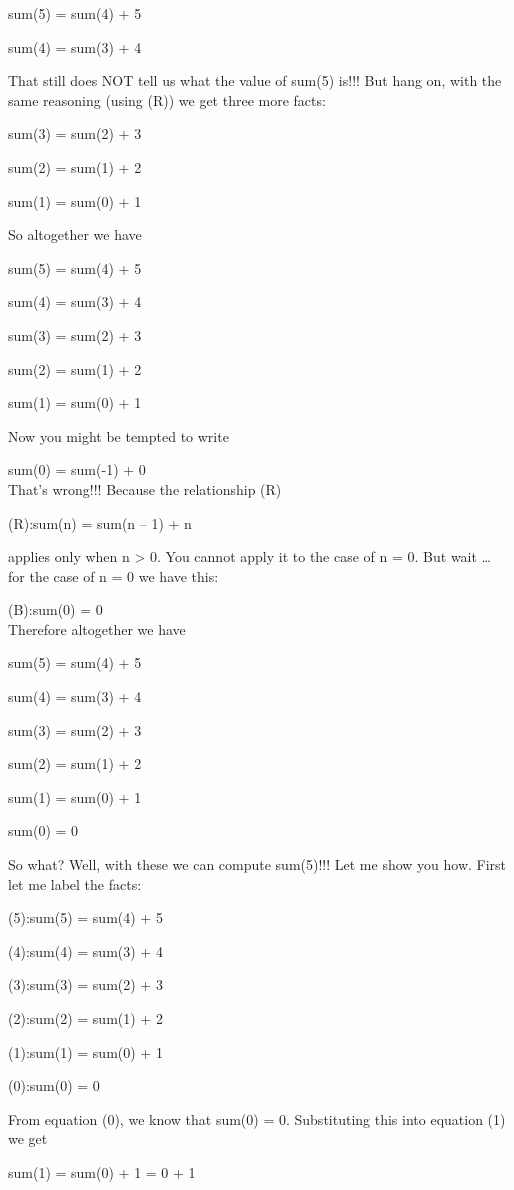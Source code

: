\documentclass[
]{article}
\begin{document}
sum(5) = sum(4) + 5

sum(4) = sum(3) + 4

That still does NOT tell us what the value of sum(5) is!!! But hang on,
with the same reasoning (using (R)) we get three more facts:

sum(3) = sum(2) + 3

sum(2) = sum(1) + 2

sum(1) = sum(0) + 1

So altogether we have

sum(5) = sum(4) + 5

sum(4) = sum(3) + 4

sum(3) = sum(2) + 3

sum(2) = sum(1) + 2

sum(1) = sum(0) + 1

Now you might be tempted to write

sum(0) = sum(-1) + 0\\

That's wrong!!! Because the relationship (R)

(R):sum(n) = sum(n -- 1) + n

applies only when n \textgreater{} 0. You cannot apply it to the case of
n = 0. But wait \ldots{} for the case of n = 0 we have this:

(B):sum(0) = 0\\

Therefore altogether we have

sum(5) = sum(4) + 5

sum(4) = sum(3) + 4

sum(3) = sum(2) + 3

sum(2) = sum(1) + 2

sum(1) = sum(0) + 1

sum(0) = 0

So what? Well, with these we can compute sum(5)!!! Let me show you how.
First let me label the facts:

(5):sum(5) = sum(4) + 5

(4):sum(4) = sum(3) + 4

(3):sum(3) = sum(2) + 3

(2):sum(2) = sum(1) + 2

(1):sum(1) = sum(0) + 1

(0):sum(0) = 0

From equation (0), we know that sum(0) = 0. Substituting this into
equation (1) we get

sum(1) = sum(0) + 1 = 0 + 1
\end{document}
